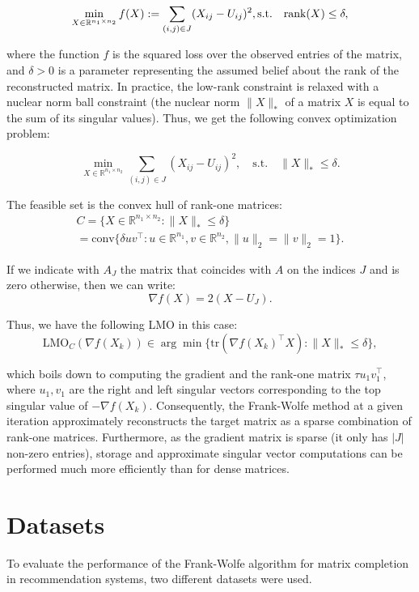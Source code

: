 \documentclass[a4paper, 11pt, reqno]{article} %
\begin{document}
\begin{multicols}{2}
\[
\min_{X \in \mathbb{R}^{n_1 \times n_2}} f(X) := \sum_{(i,j) \in J} (X_{ij} - U_{ij})^2, \\
\text{s.t.} \quad \text{rank}(X) \leq \delta,
\]


where the function \(f\) is the squared loss over the observed entries of the matrix, and \(\delta > 0\) is a parameter representing the assumed belief about the rank of the reconstructed matrix. In practice, the low-rank constraint is relaxed with a nuclear norm ball constraint (the nuclear norm \(\|X\|_*\) of a matrix \(X\) is equal to the sum of its singular values). Thus, we get the following convex optimization problem:

\[
\min_{X \in \mathbb{R}^{n_1 \times n_2}} \sum_{(i,j) \in J} (X_{ij} - U_{ij})^2, \quad \text{s.t.} \quad \|X\|_* \leq \delta.
\]

The feasible set is the convex hull of rank-one matrices:
\[
\begin{aligned}
C = \{X \in \mathbb{R}^{n_1 \times n_2} : \|X\|_* \leq \delta\} \\
= \text{conv}\{\delta uv^\top : u \in \mathbb{R}^{n_1}, v \in \mathbb{R}^{n_2}, \|u\|_2 = \|v\|_2 = 1\}.
\end{aligned}
\]



If we indicate with \(A_J\) the matrix that coincides with \(A\) on the indices \(J\) and is zero otherwise, then we can write:
\[
\nabla f(X) = 2 (X - U_J).
\]

Thus, we have the following LMO in this case:
\[
\text{LMO}_C(\nabla f(X_k)) \in \arg\min \{\text{tr}(\nabla f(X_k)^\top X) : \|X\|_* \leq \delta\},
\]

which boils down to computing the gradient and the rank-one matrix \(\tau u_1 v_1^\top\), where \(u_1, v_1\) are the right and left singular vectors corresponding to the top singular value of \(-\nabla f(X_k)\). Consequently, the Frank-Wolfe method at a given iteration approximately reconstructs the target matrix as a sparse combination of rank-one matrices. Furthermore, as the gradient matrix is sparse (it only has \(|J|\) non-zero entries), storage and approximate singular vector computations can be performed much more efficiently than for dense matrices.

\section{Datasets}

To evaluate the performance of the Frank-Wolfe algorithm for matrix completion in recommendation systems, two different datasets were used. 


\end{multicols}
\end{document}
